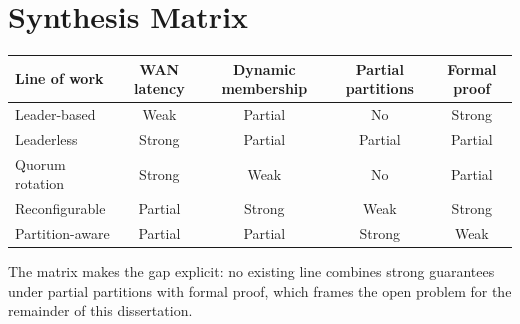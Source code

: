 \documentclass[11pt]{article}
\begin{document}
\section{Synthesis Matrix}
\begin{tabularx}{\textwidth}{@{}lCCCC@{}}
\toprule
\textbf{Line of work} & \textbf{WAN latency} & \textbf{Dynamic membership} & \textbf{Partial partitions} & \textbf{Formal proof} \\
\midrule
Leader-based    & Weak   & Partial & No      & Strong \\
Leaderless      & Strong & Partial & Partial & Partial \\
Quorum rotation & Strong & Weak    & No      & Partial \\
Reconfigurable  & Partial& Strong  & Weak    & Strong \\
Partition-aware & Partial& Partial & Strong  & Weak   \\
\bottomrule
\end{tabularx}

\vspace{0.4em}
The matrix makes the gap explicit: no existing line combines strong guarantees
under partial partitions with formal proof, which frames the open problem for
the remainder of this dissertation.
\end{document}
